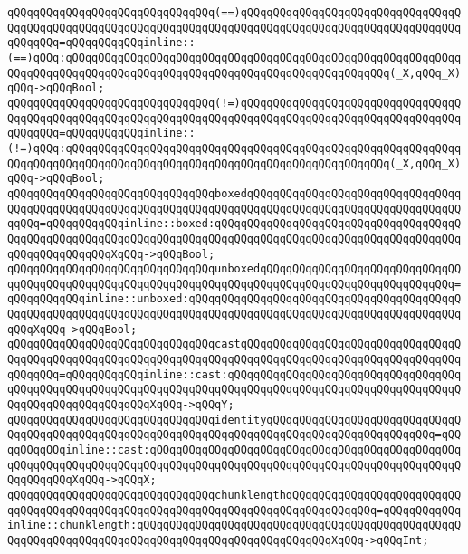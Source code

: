 \newline
\verb|qQQqqQQqqQQqqQQqqQQqqQQqqQQqqQQq(==)qQQqqQQqqQQqqQQqqQQqqQQqqQQqqQQqqQQqqQQqqQQqqQQqqQQqqQQqqQQqqQQqqQQqqQQqqQQqqQQqqQQqqQQqqQQqqQQqqQQqqQQqqQQqqQQq=qQQqqQQqqQQqinline::(==)qQQq:qQQqqQQqqQQqqQQqqQQqqQQqqQQqqQQqqQQqqQQqqQQqqQQqqQQqqQQqqQQqqQQqqQQqqQQqqQQqqQQqqQQqqQQqqQQqqQQqqQQqqQQqqQQqqQQqqQQqqQQq(_X,qQQq_X)qQQq->qQQqBool;|\newline
\verb|qQQqqQQqqQQqqQQqqQQqqQQqqQQqqQQq(!=)qQQqqQQqqQQqqQQqqQQqqQQqqQQqqQQqqQQqqQQqqQQqqQQqqQQqqQQqqQQqqQQqqQQqqQQqqQQqqQQqqQQqqQQqqQQqqQQqqQQqqQQqqQQqqQQq=qQQqqQQqqQQqinline::(!=)qQQq:qQQqqQQqqQQqqQQqqQQqqQQqqQQqqQQqqQQqqQQqqQQqqQQqqQQqqQQqqQQqqQQqqQQqqQQqqQQqqQQqqQQqqQQqqQQqqQQqqQQqqQQqqQQqqQQqqQQqqQQq(_X,qQQq_X)qQQq->qQQqBool;|\newline
\newline
\verb|qQQqqQQqqQQqqQQqqQQqqQQqqQQqqQQqboxedqQQqqQQqqQQqqQQqqQQqqQQqqQQqqQQqqQQqqQQqqQQqqQQqqQQqqQQqqQQqqQQqqQQqqQQqqQQqqQQqqQQqqQQqqQQqqQQqqQQqqQQqqQQq=qQQqqQQqqQQqinline::boxed:qQQqqQQqqQQqqQQqqQQqqQQqqQQqqQQqqQQqqQQqqQQqqQQqqQQqqQQqqQQqqQQqqQQqqQQqqQQqqQQqqQQqqQQqqQQqqQQqqQQqqQQqqQQqqQQqqQQqqQQqqQQqXqQQq->qQQqBool;|\newline
\verb|qQQqqQQqqQQqqQQqqQQqqQQqqQQqqQQqunboxedqQQqqQQqqQQqqQQqqQQqqQQqqQQqqQQqqQQqqQQqqQQqqQQqqQQqqQQqqQQqqQQqqQQqqQQqqQQqqQQqqQQqqQQqqQQqqQQqqQQq=qQQqqQQqqQQqinline::unboxed:qQQqqQQqqQQqqQQqqQQqqQQqqQQqqQQqqQQqqQQqqQQqqQQqqQQqqQQqqQQqqQQqqQQqqQQqqQQqqQQqqQQqqQQqqQQqqQQqqQQqqQQqqQQqqQQqqQQqXqQQq->qQQqBool;|\newline
\verb|qQQqqQQqqQQqqQQqqQQqqQQqqQQqqQQqcastqQQqqQQqqQQqqQQqqQQqqQQqqQQqqQQqqQQqqQQqqQQqqQQqqQQqqQQqqQQqqQQqqQQqqQQqqQQqqQQqqQQqqQQqqQQqqQQqqQQqqQQqqQQqqQQq=qQQqqQQqqQQqinline::cast:qQQqqQQqqQQqqQQqqQQqqQQqqQQqqQQqqQQqqQQqqQQqqQQqqQQqqQQqqQQqqQQqqQQqqQQqqQQqqQQqqQQqqQQqqQQqqQQqqQQqqQQqqQQqqQQqqQQqqQQqqQQqqQQqXqQQq->qQQqY;|\newline
\newline
\verb|qQQqqQQqqQQqqQQqqQQqqQQqqQQqqQQqidentityqQQqqQQqqQQqqQQqqQQqqQQqqQQqqQQqqQQqqQQqqQQqqQQqqQQqqQQqqQQqqQQqqQQqqQQqqQQqqQQqqQQqqQQqqQQqqQQq=qQQqqQQqqQQqinline::cast:qQQqqQQqqQQqqQQqqQQqqQQqqQQqqQQqqQQqqQQqqQQqqQQqqQQqqQQqqQQqqQQqqQQqqQQqqQQqqQQqqQQqqQQqqQQqqQQqqQQqqQQqqQQqqQQqqQQqqQQqqQQqqQQqXqQQq->qQQqX;|\newline
\verb|qQQqqQQqqQQqqQQqqQQqqQQqqQQqqQQqchunklengthqQQqqQQqqQQqqQQqqQQqqQQqqQQqqQQqqQQqqQQqqQQqqQQqqQQqqQQqqQQqqQQqqQQqqQQqqQQqqQQqqQQq=qQQqqQQqqQQqinline::chunklength:qQQqqQQqqQQqqQQqqQQqqQQqqQQqqQQqqQQqqQQqqQQqqQQqqQQqqQQqqQQqqQQqqQQqqQQqqQQqqQQqqQQqqQQqqQQqqQQqqQQqXqQQq->qQQqInt;|\newline
